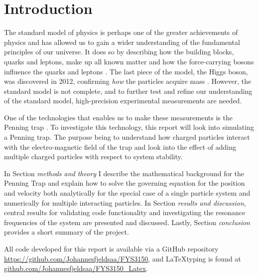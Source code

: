 \documentclass[../main_proj3.tex]{subfiles}
\begin{document}
\section{Introduction}

The standard model of physics is perhaps one of the greater achievements of physics and has allowed us to gain a wider understanding of the fundamental principles of our universe. It does so by describing how the building blocks, quarks and leptons, make up all known matter and how the force-carrying bosons influence the quarks and leptons \cite{jaffe2018physics}. The last piece of the model, the Higgs boson, was discovered in 2012, confirming \textit{how} the particles acquire mass \cite{aad2012observation}. However, the standard model is not complete, and to further test and refine our understanding of the standard model, high-precision experimental measurements are needed.

One of the technologies that enables us to make these measurements is the Penning trap \cite{ulmer2018precision}. To investigate this technology, this report will look into simulating a Penning trap. The purpose being to understand how charged particles interact with the electro-magnetic field of the trap and look into the effect of adding multiple charged particles with respect to system stability.

In Section \textit{methods and theory} I describe the mathematical background for the Penning Trap and explain how to solve the governing equation for the position and velocity both analytically for the special case of a single particle system and numerically for multiple interacting particles. In Section \textit{results and discussion}, central results for validating code functionality and investigating the resonance frequencies of the system are presented and discussed. Lastly, Section \textit{conclusion} provides a short summary of the project.

All code developed for this report is available via a GitHub repository \href{github.com/Johannesfjeldsaa/FYS3150}{https://github.com/Johannesfjeldsaa/FYS3150}, and \LaTeX typing is found at \href{https://github.com/Johannesfjeldsaa/FYS3150_Latex}{github.com/Johannesfjeldsaa/FYS3150\_Latex}.
\end{document}
